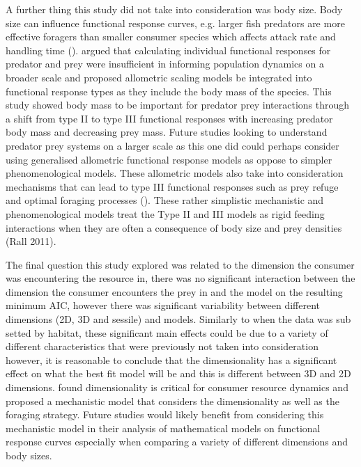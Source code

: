 \documentclass[11pt]{article}
\begin{document}
A further thing this study did not take into consideration was body size. Body size can influence functional response curves, e.g. larger fish predators are more effective foragers than smaller consumer species which affects attack rate and handling time (\cite{Dunn2020}). \cite{Kalinkat2013} argued that calculating individual functional responses for predator and prey were insufficient in informing population dynamics on a broader scale and proposed allometric scaling models be integrated into functional response types as they include the body mass of the species. This study showed body mass to be important for predator prey interactions through a shift from type II to type III functional responses with increasing predator body mass and decreasing prey mass. Future studies looking to understand predator prey systems on a larger scale as this one did could perhaps consider using generalised allometric functional response models as oppose to simpler phenomenological models. These allometric models also take into consideration mechanisms that can lead to type III functional responses such as prey refuge and optimal foraging processes    (\cite{Murdoch1975}). These rather simplistic mechanistic and phenomenological models treat the Type II and III models as rigid feeding interactions when they are often a consequence of body size and prey densities (Rall 2011).

The final question this study explored was related to the dimension the consumer was encountering the resource in, there was no significant interaction between the dimension the consumer encounters the prey in and the model on the resulting minimum AIC, however there was significant variability between different dimensions (2D, 3D and sessile) and models. Similarly to when the data was sub setted by habitat, these significant main effects could be due to a variety of different characteristics that were previously not taken into consideration however, it is reasonable to conclude that the dimensionality has a significant effect on what the best fit model will be and this is different between 3D and 2D dimensions. \cite{Pawar2012} found dimensionality is critical for consumer resource dynamics and proposed a mechanistic model that considers the dimensionality as well as the foraging strategy. Future studies would likely benefit from considering this mechanistic model in their analysis of mathematical models on functional response curves especially when comparing a variety of different dimensions and body sizes. 
\end{document}
